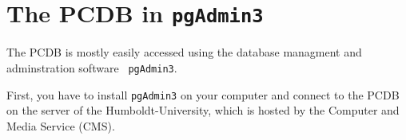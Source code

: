 \chapter{The PCDB in \texttt{\bf pgAdmin3}}\label{chap_the_PCDB_in_pgAdmin3}

The PCDB is mostly easily accessed using the database managment and adminstration software \texttt{ pgAdmin3}.

First, you have to install \texttt{pgAdmin3} on your computer and connect to the PCDB on the server of the Humboldt-University, which is hosted by the Computer and Media Service (CMS).
